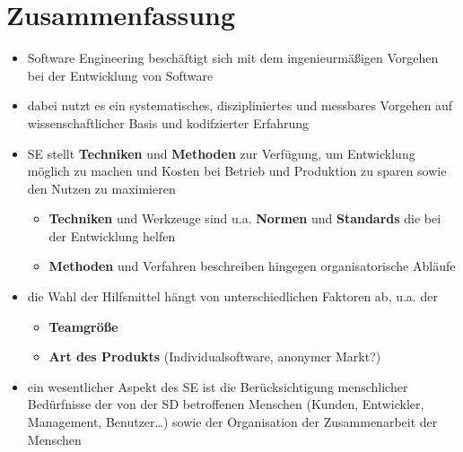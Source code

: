 \section{Zusammenfassung}

\begin{itemize}
    \item Software Engineering beschäftigt sich mit dem ingenieurmäßigen Vorgehen bei der Entwicklung von Software
    \item dabei nutzt es ein systematisches, diszipliniertes und messbares Vorgehen auf wissenschaftlicher Basis und kodifzierter Erfahrung
    \item SE stellt \textbf{Techniken} und \textbf{Methoden} zur Verfügung, um Entwicklung möglich zu machen und Kosten bei Betrieb und Produktion zu sparen sowie den Nutzen zu maximieren
        \begin{itemize}
            \item \textbf{Techniken} und Werkzeuge sind u.a. \textbf{Normen} und \textbf{Standards} die bei der Entwicklung helfen
            \item \textbf{Methoden} und Verfahren beschreiben hingegen organisatorische Abläufe
        \end{itemize}
    \item die Wahl der Hilfsmittel hängt von unterschiedlichen Faktoren ab, u.a. der
         \begin{itemize}
              \item \textbf{Teamgröße}
              \item \textbf{Art des Produkts} (Individualsoftware, anonymer Markt?)
        \end{itemize}
    \item ein wesentlicher Aspekt des SE ist die Berücksichtigung menschlicher Bedürfnisse der von der SD betroffenen Menschen (Kunden, Entwickler, Management, Benutzer\ldots) sowie der Organisation der Zusammenarbeit der Menschen
\end{itemize}